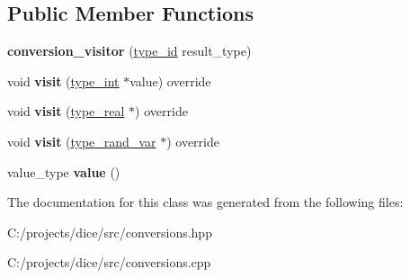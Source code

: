 \subsection*{Public Member Functions}
\begin{DoxyCompactItemize}
\item 
\mbox{\label{classdice_1_1conversion__visitor_a3014ecef08b8d88161ad9fb654ce6abd}} 
{\bfseries conversion\+\_\+visitor} (\mbox{\hyperlink{value_8hpp_ab9af7d8ecc381e026ca4d07a745f23eb}{type\+\_\+id}} result\+\_\+type)
\item 
\mbox{\label{classdice_1_1conversion__visitor_aba40c0192bb5122ea8db7abb0e79b53d}} 
void {\bfseries visit} (\mbox{\hyperlink{classdice_1_1typed__value}{type\+\_\+int}} $\ast$value) override
\item 
\mbox{\label{classdice_1_1conversion__visitor_a4ea9bf6bba994f6c7bcb9ea7ebfb842d}} 
void {\bfseries visit} (\mbox{\hyperlink{classdice_1_1typed__value}{type\+\_\+real}} $\ast$) override
\item 
\mbox{\label{classdice_1_1conversion__visitor_a4d136c9ea1d54dba2e194fd26aa56a91}} 
void {\bfseries visit} (\mbox{\hyperlink{classdice_1_1typed__value}{type\+\_\+rand\+\_\+var}} $\ast$) override
\item 
\mbox{\label{classdice_1_1conversion__visitor_ae0bbbe753e8800d5dd0b4636c8de203b}} 
value\+\_\+type {\bfseries value} ()
\end{DoxyCompactItemize}


The documentation for this class was generated from the following files\+:\begin{DoxyCompactItemize}
\item 
C\+:/projects/dice/src/conversions.\+hpp\item 
C\+:/projects/dice/src/conversions.\+cpp\end{DoxyCompactItemize}

